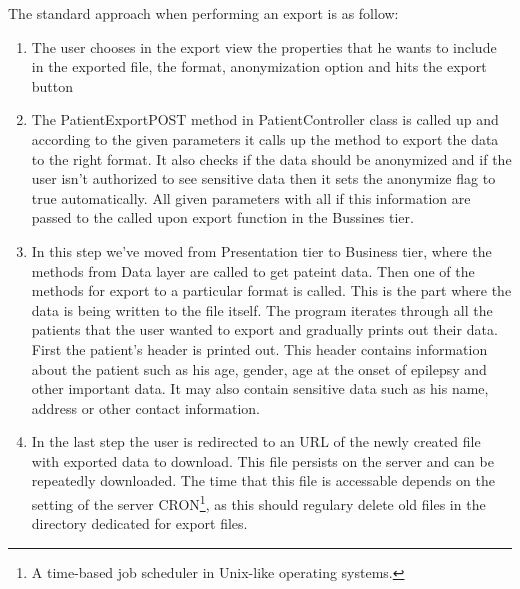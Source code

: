 \documentclass[thesis=B,english]{FITthesis}[2012/10/20]
\begin{document}
The standard approach when performing an export is as follow:
\begin{enumerate}
\item{ The user chooses in the export view the properties that he wants to include in the exported file, the format, anonymization option and hits the export button }
\item{ The PatientExportPOST method in PatientController class is called up and according to the given parameters it calls up the method to export the data to the right format. It also checks if the data should be anonymized and if the user isn't authorized to see sensitive data then it sets the anonymize flag to true automatically. All given parameters with all if this information are passed to the called upon export function in the Bussines tier.}
\item{ In this step we've moved from Presentation tier to Business tier, where the methods from Data layer are called to get pateint data. Then one of the methods for export to a particular format is called. This is the part where the data is being written to the file itself. The program iterates through all the patients that the user wanted to export and gradually prints out their data.}
First the patient's header is printed out. This header contains information about the patient such as his age, gender, age at the onset of epilepsy and other important data. It may also contain sensitive data such as his name, address or other contact information.
\item{ In the last step the user is redirected to an URL of the newly created file with exported data to download. This file persists on the server and can be repeatedly downloaded. The time that this file is accessable depends on the setting of the server CRON\footnote{A time-based job scheduler in Unix-like operating systems.}, as this should regulary delete old files in the directory dedicated for export files.}

\end{enumerate}
\end{document}
